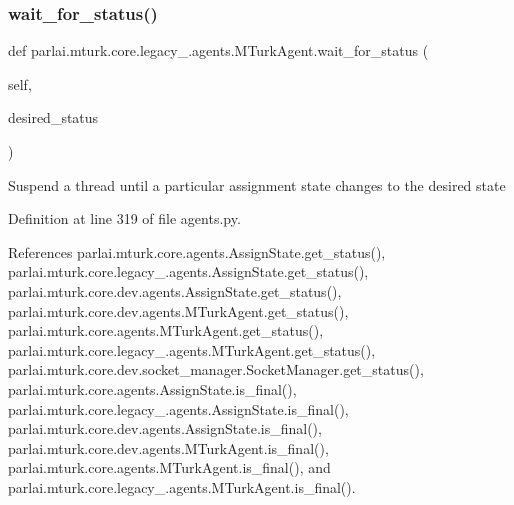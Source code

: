 \subsubsection{\texorpdfstring{wait\+\_\+for\+\_\+status()}{wait\_for\_status()}}
{\footnotesize\ttfamily def parlai.\+mturk.\+core.\+legacy\+\_.\+agents.\+M\+Turk\+Agent.\+wait\+\_\+for\+\_\+status (\begin{DoxyParamCaption}\item[{}]{self,  }\item[{}]{desired\+\_\+status }\end{DoxyParamCaption})}

\begin{DoxyVerb}Suspend a thread until a particular assignment state changes
to the desired state
\end{DoxyVerb}
 

Definition at line 319 of file agents.\+py.



References parlai.\+mturk.\+core.\+agents.\+Assign\+State.\+get\+\_\+status(), parlai.\+mturk.\+core.\+legacy\+\_.\+agents.\+Assign\+State.\+get\+\_\+status(), parlai.\+mturk.\+core.\+dev.\+agents.\+Assign\+State.\+get\+\_\+status(), parlai.\+mturk.\+core.\+dev.\+agents.\+M\+Turk\+Agent.\+get\+\_\+status(), parlai.\+mturk.\+core.\+agents.\+M\+Turk\+Agent.\+get\+\_\+status(), parlai.\+mturk.\+core.\+legacy\+\_.\+agents.\+M\+Turk\+Agent.\+get\+\_\+status(), parlai.\+mturk.\+core.\+dev.\+socket\+\_\+manager.\+Socket\+Manager.\+get\+\_\+status(), parlai.\+mturk.\+core.\+agents.\+Assign\+State.\+is\+\_\+final(), parlai.\+mturk.\+core.\+legacy\+\_.\+agents.\+Assign\+State.\+is\+\_\+final(), parlai.\+mturk.\+core.\+dev.\+agents.\+Assign\+State.\+is\+\_\+final(), parlai.\+mturk.\+core.\+dev.\+agents.\+M\+Turk\+Agent.\+is\+\_\+final(), parlai.\+mturk.\+core.\+agents.\+M\+Turk\+Agent.\+is\+\_\+final(), and parlai.\+mturk.\+core.\+legacy\+\_.\+agents.\+M\+Turk\+Agent.\+is\+\_\+final().


